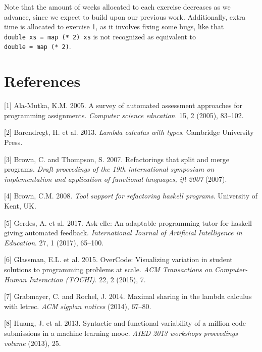 \documentclass[a4paperpaper,]{report}
\begin{document}
Note that the amount of weeks allocated to each exercise decreases as we
advance, since we expect to build upon our previous work. Additionally,
extra time is allocated to exercise 1, as it involves fixing some bugs,
like that \texttt{double\ xs\ =\ map\ (*\ 2)\ xs} is not recognized as
equivalent to \texttt{double\ =\ map\ (*\ 2)}.

\hypertarget{references}{%
\chapter*{References}\label{references}}

\hypertarget{refs}{}
\leavevmode\hypertarget{ref-2005alasurvey}{}%
{[}1{]} Ala-Mutka, K.M. 2005. A survey of automated assessment
approaches for programming assignments. \emph{Computer science
education}. 15, 2 (2005), 83--102.

\leavevmode\hypertarget{ref-2013lambda}{}%
{[}2{]} Barendregt, H. et al. 2013. \emph{Lambda calculus with types}.
Cambridge University Press.

\leavevmode\hypertarget{ref-2007brown}{}%
{[}3{]} Brown, C. and Thompson, S. 2007. Refactorings that split and
merge programs. \emph{Draft proceedings of the 19th international
symposium on implementation and application of functional languages, ifl
2007} (2007).

\leavevmode\hypertarget{ref-2008brown}{}%
{[}4{]} Brown, C.M. 2008. \emph{Tool support for refactoring haskell
programs}. University of Kent, UK.

\leavevmode\hypertarget{ref-2017askelle}{}%
{[}5{]} Gerdes, A. et al. 2017. Ask-elle: An adaptable programming tutor
for haskell giving automated feedback. \emph{International Journal of
Artificial Intelligence in Education}. 27, 1 (2017), 65--100.

\leavevmode\hypertarget{ref-2015overcode}{}%
{[}6{]} Glassman, E.L. et al. 2015. OverCode: Visualizing variation in
student solutions to programming problems at scale. \emph{ACM
Transactions on Computer-Human Interaction (TOCHI)}. 22, 2 (2015), 7.

\leavevmode\hypertarget{ref-2014letrec}{}%
{[}7{]} Grabmayer, C. and Rochel, J. 2014. Maximal sharing in the lambda
calculus with letrec. \emph{ACM sigplan notices} (2014), 67--80.

\leavevmode\hypertarget{ref-2013huang}{}%
{[}8{]} Huang, J. et al. 2013. Syntactic and functional variability of a
million code submissions in a machine learning mooc. \emph{AIED 2013
workshops proceedings volume} (2013), 25.
\end{document}
